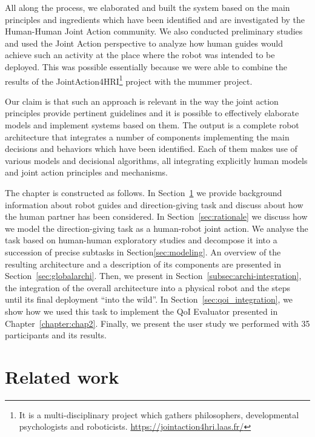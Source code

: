 \documentclass[a4paper,11pt,twoside]{StyleThese}
\begin{document}
All along the process, we elaborated and built the system based on the main principles and ingredients which have been identified and are investigated by the Human-Human Joint Action community. We also conducted preliminary studies and used the Joint Action perspective to analyze how human guides would achieve such an activity at the place where the robot was intended to be deployed. This was possible essentially because we were able to combine the results of the JointAction4HRI\footnote{It is a multi-disciplinary project which gathers philosophers, developmental psychologists and roboticists. \url{https://jointaction4hri.laas.fr/}} project with the \acrshort{mummer} project.

Our claim is that such an approach is relevant in the way the joint action principles provide pertinent guidelines and it is possible to effectively elaborate models and implement systems based on them. 
The output is a complete robot architecture that integrates a number of components implementing the main decisions and behaviors which have been identified. Each of them makes use of various models and decisional algorithms, all integrating explicitly human models and joint action principles and mechanisms.


The chapter is constructed as follows. In Section~\ref{sec:related-work} we provide background information about robot guides and direction-giving task and discuss about how the human partner has been considered. In Section~\ref{sec:rationale} we discuss how we model the direction-giving task as a human-robot joint action. We analyse the task based on human-human exploratory studies and decompose it into a succession of precise subtasks in Section\ref{sec:modeling}. An overview of the resulting architecture and a description of its components are presented in Section~\ref{sec:globalarchi}. Then, we present in Section~\ref{subsec:archi-integration}, the integration of the overall architecture into a physical robot and the steps until its final deployment ``into the wild''. In Section~\ref{sec:qoi_integration}, we show how we used this task to implement the QoI Evaluator presented in Chapter~\ref{chapter:chap2}. Finally, we present the user study we performed with 35 participants and its results.



\section{Related work}
\label{sec:related-work}
\end{document}
